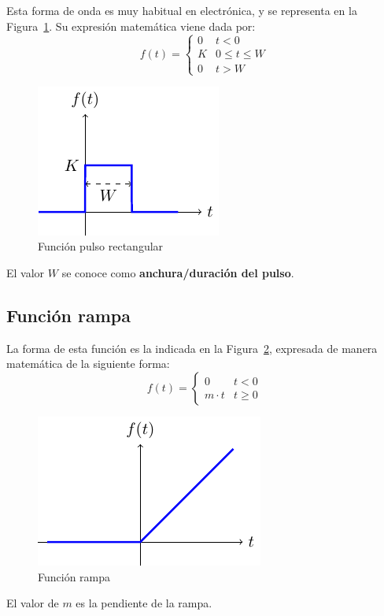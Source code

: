 \documentclass[11pt]{book} %
\begin{document}
	Esta forma de onda es muy habitual en electrónica, y se representa en la Figura~\ref{fig.pulso}. Su expresión matemática viene dada por:
	\begin{equation}
		\boxed{f(t) = %
			\begin{cases}
				0 & t < 0\\
				K & 0 \leq t \leq W\\
				0 & t>W
		\end{cases}}
	\end{equation}
	\begin{figure}[htbp]
		\centering
		\includegraphics[width=.35\linewidth]{../figs/pulso.pdf}
		\caption{Función pulso rectangular}
		\label{fig.pulso}
	\end{figure}
	
	El valor $W$ se conoce como \textbf{anchura/duración del pulso}. 
	
	\subsection{Función rampa}
	La forma de esta función es la indicada en la Figura~\ref{fig.rampa}, expresada de manera matemática de la siguiente forma: 
	\begin{equation}
		\boxed{f(t) = %
			\begin{cases}
				0 & t < 0\\
				m \cdot t  & t \geq 0
		\end{cases}}
	\end{equation}
	\begin{figure}[htbp]
		\centering
		\includegraphics[width=0.35\linewidth]{../figs/rampa.pdf}
		\caption{Función rampa}
		\label{fig.rampa}
	\end{figure}
	El valor de $m$ es la pendiente de la rampa.
	
\end{document}
